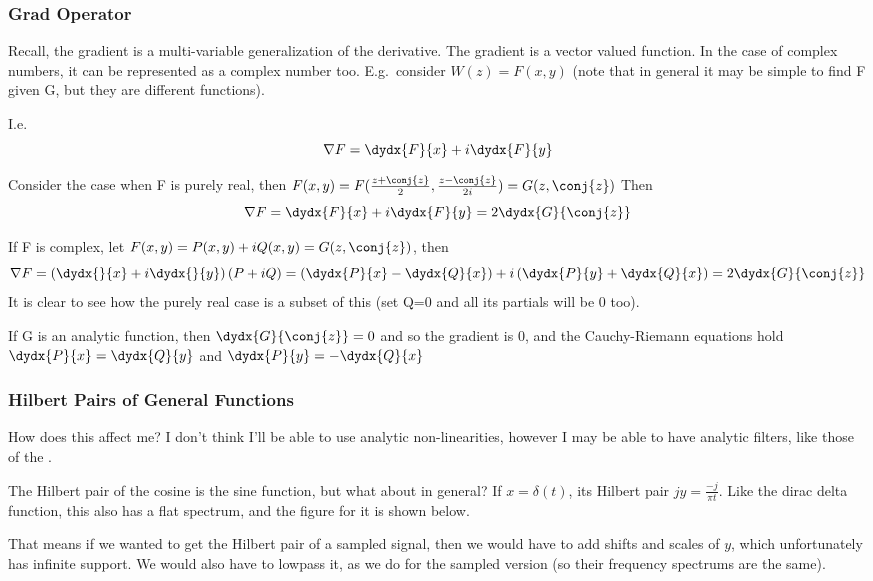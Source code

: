 \subsubsection*{Grad Operator}
Recall, the gradient is a multi-variable  generalization of the derivative. The
gradient is a vector valued function. In the case of complex numbers, it can be
represented as a complex number too. E.g.\ consider $W(z) = F(x,y)$ (note that
in general it may be simple to find F given G, but they are different
functions).

I.e. 
$$\nabla F = \dydx{F}{x} + i \dydx{F}{y}$$

Consider the case when F is purely real, then 
$F(x,y) = F(\frac{z+\conj{z}}{2},\frac{z-\conj{z}}{2i}) = G(z,\conj{z})$
Then
$$\nabla F = \dydx{F}{x} + i \dydx{F}{y} = 2\dydx{G}{\conj{z}}$$

If F is complex, let $F(x,y) = P(x,y) + iQ(x,y) = G(z,\conj{z})$, then
$$\nabla F = \left(\dydx{}{x} + i \dydx{}{y}\right)(P+iQ) 
           = \left(\dydx{P}{x} - \dydx{Q}{x}\right) + 
                i\left(\dydx{P}{y} + \dydx{Q}{x}\right) 
           = 2\dydx{G}{\conj{z}}$$
It is clear to see how the purely real case is a subset of this (set Q=0 and
all its partials will be 0 too).

If G is an analytic function, then $\dydx{G}{\conj{z}} = 0$ and so the gradient
is 0, and the Cauchy-Riemann equations hold $\dydx{P}{x}=\dydx{Q}{y}$ and 
$\dydx{P}{y}=-\dydx{Q}{x}$

\subsubsection*{Hilbert Pairs of General Functions}
  How does this affect me? I don't think I'll be able to use analytic
  non-linearities, however I may be able to have analytic filters, like those of
  the \DTCWT.

  The Hilbert pair of the cosine is the sine function, but what about in general?
  If $x=\delta(t)$, its Hilbert pair $jy = \frac{-j}{\pi t}$. Like the dirac
  delta function, this also has a flat spectrum, and the figure for it is shown
  below.

  \begin{center}
    
  \end{center}

  That means if we wanted to get the Hilbert pair of a sampled signal, then we
  would have to add shifts and scales of $y$, which unfortunately has infinite
  support. We would also have to lowpass it, as we do for the sampled version
  (so their frequency spectrums are the same).

